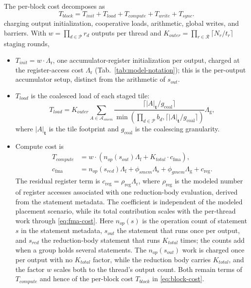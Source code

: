 \documentclass[acmsmall,review,anonymous,screen]{acmart}
\newcommand{\tile}{t}
\newcommand{\tvec}{\mathbf{t}}
\newcommand{\rblk}{r}
\newcommand{\work}{w}
\newcommand{\gcoal}{g_{\mathrm{coal}}}
\newcommand{\Lg}{\Lambda_{\mathrm g}}
\newcommand{\Ls}{\Lambda_{\mathrm s}}
\newcommand{\Lr}{\Lambda_{\mathrm r}}
\newcommand{\Lf}{\Lambda_{\mathrm f}}
\newcommand{\cfma}{c_{\mathrm{fma}}}
\newcommand{\creg}{c_{\mathrm{reg}}}
\begin{document}
The per-block cost decomposes as
\begin{equation}
T_{\mathit{block}}
= T_{\mathit{init}} + T_{\mathit{load}} + T_{\mathit{compute}} +
   T_{\mathit{write}} + T_{\mathit{sync}}.
\label{eq:block-cost}
\end{equation}
charging output initialization, cooperative loads, arithmetic, global writes, and barriers. With \(\work=\prod_{d\in\mathcal{P}}\rblk_d\) outputs per thread and \(K_{\mathit{outer}}=\prod_{r\in\mathcal{R}}\lceil N_r/\tile_r\rceil\) staging rounds,
\begin{itemize}
  \item \(T_{\mathit{init}} = \work \cdot \Lr\), one accumulator-register initialization per output, charged at the register-access cost \(\Lr\) (Tab.~\ref{tab:model-notation}); this is the per-output accumulator setup, distinct from the arithmetic of \(s_{\mathit{out}}\).
  \item \(T_{\mathit{load}}\) is the coalesced load of each staged tile:
  \[
  T_{\mathit{load}} = K_{\mathit{outer}}\sum_{A \in \mathcal{A}_{\mathit{smem}}}
  \frac{\lceil |A|_{\tvec} / \gcoal \rceil}{\min(\prod_{d \in \mathcal{P}} b_d,\lceil |A|_{\tvec} / \gcoal \rceil)}
  \Lg,
  \]
  where \(|A|_{\tvec}\) is the tile footprint and \(\gcoal\) is the coalescing granularity.
  \item Compute cost is
  \begin{equation}
	  \begin{aligned}
	  T_{\mathit{compute}} &= \work \cdot
	    \left(n_{\mathit{op}}(s_{\mathit{out}})\Lf
	    + K_{\mathit{total}}\cdot\cfma\right),\\[1ex]
	  \cfma &= n_{\mathit{op}}(s_{\mathit{red}})\Lf
	  + \phi_{\mathit{smem}}\Ls
	  + \phi_{\mathit{gmem}}\Lg
	  + \creg.
	  \end{aligned}
	  \label{eq:fma-cost}
	  \end{equation}
	  The residual register term is \(\creg=\rho_{\mathrm{reg}}\Lr\), where \(\rho_{\mathrm{reg}}\) is the modeled number of register accesses associated with one reduction-body evaluation, derived from the statement metadata. The coefficient is independent of the modeled placement scenario, while its total contribution scales with the per-thread work through \autoref{eq:fma-cost}. Here \(n_{\mathit{op}}(s)\) is the operation count of statement \(s\) in the statement metadata, \(s_{\mathit{out}}\) the statement that runs once per output, and \(s_{\mathit{red}}\) the reduction-body statement that runs \(K_{\mathit{total}}\) times; the counts add when a group holds several statements. The \(n_{\mathit{op}}(s_{\mathit{out}})\) work is charged once per output with no \(K_{\mathit{total}}\) factor, while the reduction body carries \(K_{\mathit{total}}\), and the factor \(\work\) scales both to the thread's output count. Both remain terms of \(T_{\mathit{compute}}\) and hence of the per-block cost \(T_{\mathit{block}}\) in \autoref{eq:block-cost}.

\end{itemize}
\end{document}
